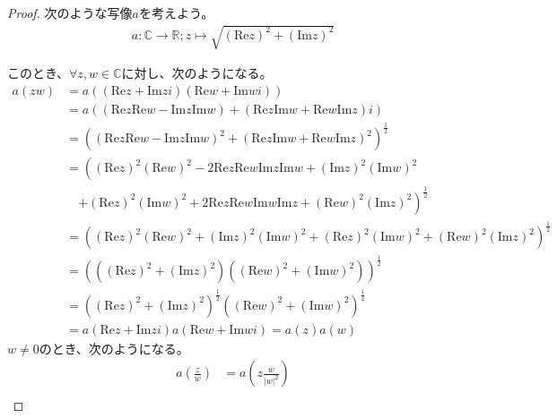 \documentclass[dvipdfmx]{jsarticle}
\begin{document}
\begin{proof} 次のような写像$a$を考えよう。
\begin{align*}
a:\mathbb{C} \rightarrow \mathbb{R};z \mapsto \sqrt{\left( \mathrm{Re}z \right)^{2} + \left( \mathrm{Im}z \right)^{2}}
\end{align*}\par
このとき、$\forall z,w \in \mathbb{C}$に対し、次のようになる。
\begin{align*}
a(zw) &= a\left( \left( \mathrm{Re}z + \mathrm{Im}zi \right)\left( \mathrm{Re}w + \mathrm{Im}wi \right) \right)\\
&= a\left( \left( \mathrm{Re}z\mathrm{Re}w - \mathrm{Im}z\mathrm{Im}w \right) + \left( \mathrm{Re}z\mathrm{Im}w + \mathrm{Re}w\mathrm{Im}z \right)i \right)\\
&= \left( \left( \mathrm{Re}z\mathrm{Re}w - \mathrm{Im}z\mathrm{Im}w \right)^{2} + \left( \mathrm{Re}z\mathrm{Im}w + \mathrm{Re}w\mathrm{Im}z \right)^{2} \right)^{\frac{1}{2}}\\
&= \left( \left( \mathrm{Re}z \right)^{2}\left( \mathrm{Re}w \right)^{2} - 2\mathrm{Re}z\mathrm{Re}w\mathrm{Im}z\mathrm{Im}w + \left( \mathrm{Im}z \right)^{2}\left( \mathrm{Im}w \right)^{2} \right. \\
&\quad \left.+ \left( \mathrm{Re}z \right)^{2}\left( \mathrm{Im}w \right)^{2} + 2\mathrm{Re}z\mathrm{Re}w\mathrm{Im}w\mathrm{Im}z + \left( \mathrm{Re}w \right)^{2}\left( \mathrm{Im}z \right)^{2} \right)^{\frac{1}{2}}\\
&= \left( \left( \mathrm{Re}z \right)^{2}\left( \mathrm{Re}w \right)^{2} + \left( \mathrm{Im}z \right)^{2}\left( \mathrm{Im}w \right)^{2} + \left( \mathrm{Re}z \right)^{2}\left( \mathrm{Im}w \right)^{2} + \left( \mathrm{Re}w \right)^{2}\left( \mathrm{Im}z \right)^{2} \right)^{\frac{1}{2}}\\
&= \left( \left( \left( \mathrm{Re}z \right)^{2} + \left( \mathrm{Im}z \right)^{2} \right)\left( \left( \mathrm{Re}w \right)^{2} + \left( \mathrm{Im}w \right)^{2} \right) \right)^{\frac{1}{2}}\\
&= \left( \left( \mathrm{Re}z \right)^{2} + \left( \mathrm{Im}z \right)^{2} \right)^{\frac{1}{2}}\left( \left( \mathrm{Re}w \right)^{2} + \left( \mathrm{Im}w \right)^{2} \right)^{\frac{1}{2}}\\
&= a\left( \mathrm{Re}z + \mathrm{Im}zi \right)a\left( \mathrm{Re}w + \mathrm{Im}wi \right) = a(z)a(w)
\end{align*}
$w \neq 0$のとき、次のようになる。
\begin{align*}
a\left( \frac{z}{w} \right) &= a\left( z\frac{\overline{w}}{|w|^{2}} \right)\\

\end{align*}
\end{proof}
\end{document}
